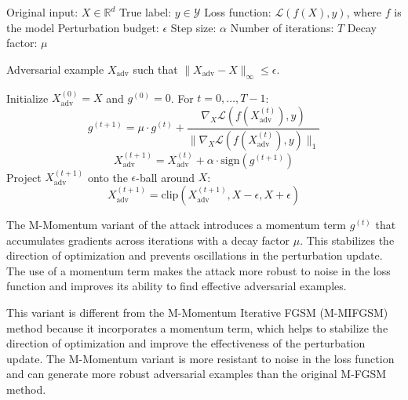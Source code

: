 Original input: $X \in \mathbb{R}^d$
True label: $y \in \mathcal{Y}$
Loss function: $\mathcal{L}(f(X), y)$, where $f$ is the model
Perturbation budget: $\epsilon$
Step size: $\alpha$
Number of iterations: $T$
Decay factor: $\mu$

Adversarial example $X_{\text{adv}}$ such that $\|X_{\text{adv}} - X\|_\infty \leq \epsilon$.

Initialize $X^{(0)}_{\text{adv}} = X$ and $g^{(0)} = 0$. For $t = 0, \dots, T-1$:
\[g^{(t+1)} = \mu \cdot g^{(t)} + \frac{\nabla_X \mathcal{L}(f(X^{(t)}_{\text{adv}}), y)}{\|\nabla_X \mathcal{L}(f(X^{(t)}_{\text{adv}}), y)\|_1}\]
\[X^{(t+1)}_{\text{adv}} = X^{(t)}_{\text{adv}} + \alpha \cdot \text{sign}(g^{(t+1)})\]
Project $X^{(t+1)}_{\text{adv}}$ onto the $\epsilon$-ball around $X$:
\[X^{(t+1)}_{\text{adv}} = \text{clip}(X^{(t+1)}_{\text{adv}}, X - \epsilon, X + \epsilon)\]

The M-Momentum variant of the attack introduces a momentum term $g^{(t)}$ that accumulates gradients across iterations with a decay factor $\mu$. This stabilizes the direction of optimization and prevents oscillations in the perturbation update. The use of a momentum term makes the attack more robust to noise in the loss function and improves its ability to find effective adversarial examples.

This variant is different from the M-Momentum Iterative FGSM (M-MIFGSM) method because it incorporates a momentum term, which helps to stabilize the direction of optimization and improve the effectiveness of the perturbation update. The M-Momentum variant is more resistant to noise in the loss function and can generate more robust adversarial examples than the original M-FGSM method.